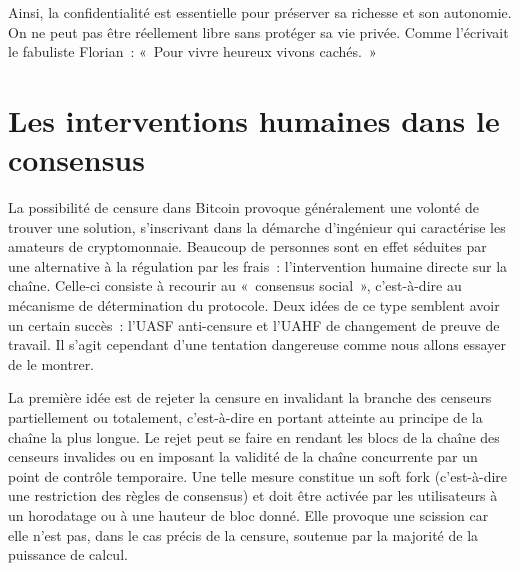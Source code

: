Ainsi, la confidentialité est essentielle pour préserver sa richesse et son autonomie. On ne peut pas être réellement libre sans protéger sa vie privée. Comme l'écrivait le fabuliste Florian~: «~Pour vivre heureux vivons cachés.~»

\section*{Les interventions humaines dans le consensus}

La possibilité de censure dans Bitcoin provoque généralement une volonté de trouver une solution, s'inscrivant dans la démarche d'ingénieur qui caractérise les amateurs de cryptomonnaie. Beaucoup de personnes sont en effet séduites par une alternative à la régulation par les frais~: l'intervention humaine directe sur la chaîne. Celle-ci consiste à recourir au «~consensus social~», c'est-à-dire au mécanisme de détermination du protocole. Deux idées de ce type semblent avoir un certain succès~: l'UASF anti-censure et l'UAHF de changement de preuve de travail. Il s'agit cependant d'une tentation dangereuse comme nous allons essayer de le montrer.



La première idée est de rejeter la censure en invalidant la branche des censeurs partiellement ou totalement, c'est-à-dire en portant atteinte au principe de la chaîne la plus longue. Le rejet peut se faire en rendant les blocs de la chaîne des censeurs invalides ou en imposant la validité de la chaîne concurrente par un point de contrôle temporaire. Une telle mesure constitue un soft fork (c'est-à-dire une restriction des règles de consensus) et doit être activée par les utilisateurs à un horodatage ou à une hauteur de bloc donné. Elle provoque une scission car elle n'est pas, dans le cas précis de la censure, soutenue par la majorité de la puissance de calcul.

